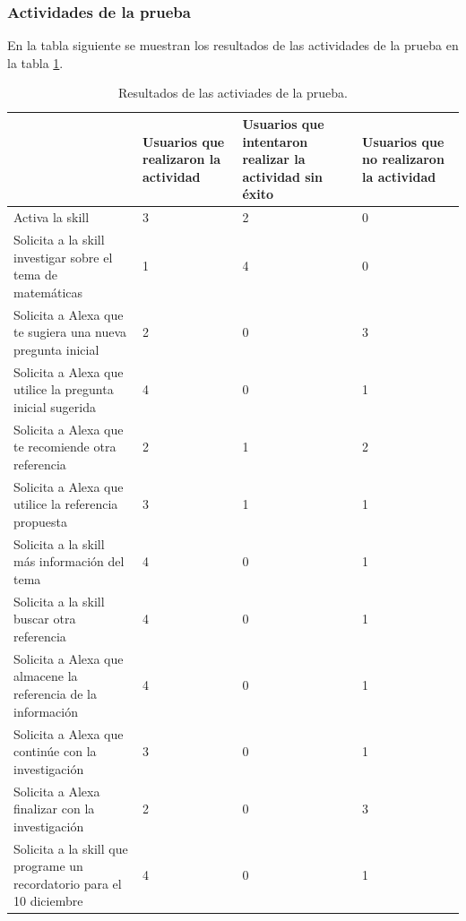 
\subsubsection{Actividades de la prueba}
\label{ActividadesPruebacapIV}

En la tabla siguiente se muestran los resultados de las actividades de la prueba en la tabla \ref{tab:t43}.

\begin{table}[t]
  \begin{center}
    \begin{tabular}{ | p{7cm} | p{3cm} | p{3cm} | p{3cm} | }
      \hline
       & Usuarios que realizaron la actividad & Usuarios que intentaron realizar la actividad sin éxito & Usuarios que no realizaron la actividad \\ \hline
      Activa la skill & 3 & 2 & 0 \\ \hline
      Solicita a la skill investigar sobre el tema de matemáticas & 1 & 4 & 0 \\ \hline
      Solicita a Alexa que te sugiera una nueva pregunta inicial & 2 & 0 & 3 \\ \hline
      Solicita a Alexa que utilice la pregunta inicial sugerida & 4 & 0 & 1 \\ \hline
      Solicita a Alexa que te recomiende otra referencia & 2 & 1 & 2 \\ \hline
      Solicita a Alexa que utilice la referencia propuesta & 3 & 1 & 1 \\ \hline
      Solicita a la skill más información del tema & 4 & 0 & 1 \\ \hline
      Solicita a la skill buscar otra referencia & 4 & 0 & 1 \\ \hline
      Solicita a Alexa que almacene la referencia de la información & 4 & 0 & 1 \\ \hline
      Solicita a Alexa que continúe con la investigación & 3 & 0 & 1 \\ \hline
      Solicita a Alexa finalizar con la investigación & 2 & 0 & 3 \\ \hline
      Solicita a la skill que programe un recordatorio para el 10 diciembre & 4 & 0 & 1 \\ \hline
    \end{tabular}
    \caption{Resultados de las activiades de la prueba.}
    \label{tab:t43}
  \end{center}
\end{table}

